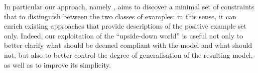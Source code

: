 %
In particular our approach, namely \nd, aims to discover a minimal set of constraints that to distinguish between the two classes of examples: in this sense, it can enrich existing approaches that provide descriptions of the positive example set only. Indeed, our exploitation of the ``upside-down world'' is useful not only to better clarify what should be deemed compliant with the model and what should not, but also to better control the degree of generalisation of the resulting model, as well as to improve its simplicity.


%

